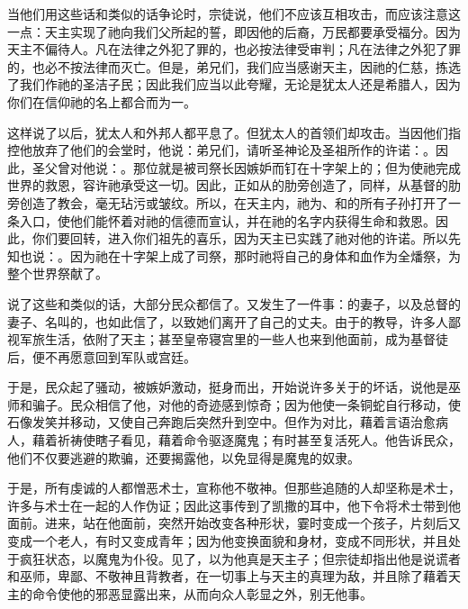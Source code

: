 当他们用这些话和类似的话争论时，宗徒说，他们不应该互相攻击，而应该注意这一点：天主实现了祂向我们父所起的誓，即因他的后裔，万民都要承受福分。因为天主不偏待人。凡在法律之外犯了罪的，也必按法律受审判；凡在法律之外犯了罪的，也必不按法律而灭亡。但是，弟兄们，我们应当感谢天主，因祂的仁慈，拣选了我们作祂的圣洁子民；因此我们应当以此夸耀，无论是犹太人还是希腊人，因为你们在信仰祂的名上都合而为一。\par

这样说了以后，犹太人和外邦人都平息了。但犹太人的首领们却攻击。当因他们指控他放弃了他们的会堂时，他说：弟兄们，请听圣神论及圣祖所作的许诺：。因此，圣父曾对他说：。那位就是被司祭长因嫉妒而钉在十字架上的；但为使祂完成世界的救恩，容许祂承受这一切。因此，正如从的肋旁创造了，同样，从基督的肋旁创造了教会，毫无玷污或皱纹。所以，在天主内，祂为、和的所有子孙打开了一条入口，使他们能怀着对祂的信德而宣认，并在祂的名字内获得生命和救恩。因此，你们要回转，进入你们祖先的喜乐，因为天主已实践了祂对他的许诺。所以先知也说：。因为祂在十字架上成了司祭，那时祂将自己的身体和血作为全燔祭，为整个世界祭献了。\par

说了这些和类似的话，大部分民众都信了。又发生了一件事：的妻子，以及总督的妻子、名叫的，也如此信了，以致她们离开了自己的丈夫。由于的教导，许多人鄙视军旅生活，依附了天主；甚至皇帝寝宫里的一些人也来到他面前，成为基督徒后，便不再愿意回到军队或宫廷。\par

于是，民众起了骚动，被嫉妒激动，挺身而出，开始说许多关于的坏话，说他是巫师和骗子。民众相信了他，对他的奇迹感到惊奇；因为他使一条铜蛇自行移动，使石像发笑并移动，又使自己奔跑后突然升到空中。但作为对比，藉着言语治愈病人，藉着祈祷使瞎子看见，藉着命令驱逐魔鬼；有时甚至复活死人。他告诉民众，他们不仅要逃避的欺骗，还要揭露他，以免显得是魔鬼的奴隶。\par

于是，所有虔诚的人都憎恶术士，宣称他不敬神。但那些追随的人却坚称是术士，许多与术士在一起的人作伪证；因此这事传到了凯撒的耳中，他下令将术士带到他面前。进来，站在他面前，突然开始改变各种形状，霎时变成一个孩子，片刻后又变成一个老人，有时又变成青年；因为他变换面貌和身材，变成不同形状，并且处于疯狂状态，以魔鬼为仆役。见了，以为他真是天主子；但宗徒却指出他是说谎者和巫师，卑鄙、不敬神且背教者，在一切事上与天主的真理为敌，并且除了藉着天主的命令使他的邪恶显露出来，从而向众人彰显之外，别无他事。\par

